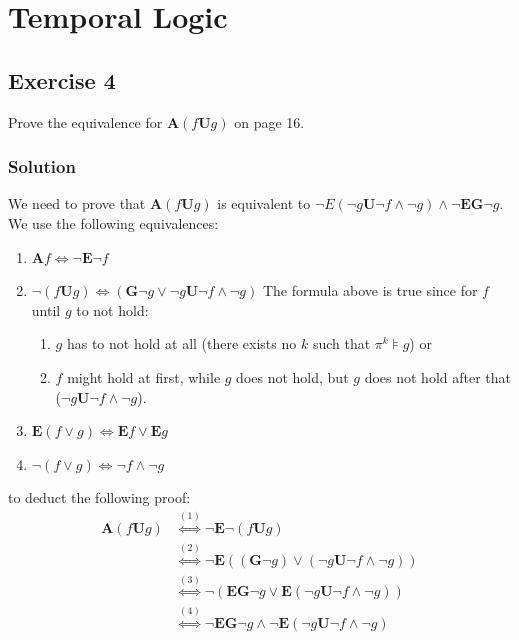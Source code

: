 \documentclass[a4paper, 12pt]{article}
\newcommand{\codeinput}[1]
{
    \begin{leftbar}
        {\fontsize{9pt}{11pt}}
    \end{leftbar}
}
\begin{document}
\codeinput{bdd_to_formula}

\section{Temporal Logic}

\subsection{Exercise 4}

Prove the equivalence for $\mathbf{A}(f \mathbf{U} g)$ on page 16.

\subsubsection{Solution}

We need to prove that $\mathbf{A}(f \mathbf{U} g)$ is equivalent to $¬E(¬g
\mathbf{U} ¬f ∧ ¬g) ∧ ¬\mathbf{EG} ¬g$. We use the following equivalences:

\begin{enumerate}[label=(\arabic*)]
    \item $\mathbf{A} f ⇔ ¬\mathbf{E}¬f$
    \item $¬(f \mathbf{U} g) ⇔ (\mathbf{G}¬g ∨ ¬g \mathbf{U} ¬f ∧ ¬g)$
    The formula above is true since for $f$ until $g$ to not hold:
        \begin{enumerate}

            \item $g$ has to not hold at all (there exists no $k$ such that
            $π^k⊧g$) or

            \item $f$ might hold at first, while $g$ does not hold, but $g$
            does not hold after that ($¬g \mathbf{U} ¬f ∧ ¬g$).

        \end{enumerate}

    \item $\mathbf{E}(f ∨ g) ⇔ \mathbf{E}f ∨ \mathbf{E}g$
    \item $¬ (f ∨ g) ⇔ ¬f ∧ ¬g$
\end{enumerate}

to deduct the following proof:
\begin{align*}
    \mathbf{A}\left(f \mathbf{U} g\right)
    & \stackrel{(1)}{⇔} ¬\mathbf{E} ¬\left(f\mathbf{U} g\right)\\
    & \stackrel{(2)}{⇔} ¬\mathbf{E} \left(\left(\mathbf{G}¬g\right) ∨
      \left(¬g\mathbf{U} ¬f ∧ ¬g\right)\right)\\
    & \stackrel{(3)}{⇔} ¬\left(\mathbf{EG}¬g ∨
      \mathbf{E}\left(¬g\mathbf{U} ¬f ∧ ¬g\right)\right)\\
    & \stackrel{(4)}{⇔} ¬\mathbf{EG}¬g ∧ ¬\mathbf{E}\left(¬g\mathbf{U} ¬f ∧
      ¬g\right)\\
\end{align*}
\end{document}
